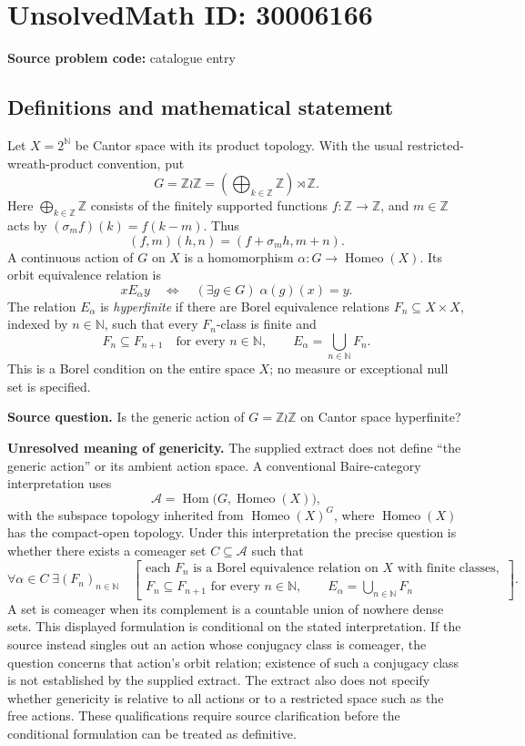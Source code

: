 \documentclass[11pt]{article}
\newcommand{\N}{\mathbb{N}}
\newcommand{\Z}{\mathbb{Z}}
\begin{document}
\section*{UnsolvedMath ID: 30006166}
\textbf{Source problem code:} catalogue entry
\subsection{Definitions and mathematical statement}
Let \(X=2^{\N}\) be Cantor space with its product topology. With the usual restricted-wreath-product convention, put
\[
G=\Z\wr\Z=\left(\bigoplus_{k\in\Z}\Z\right)\rtimes\Z.
\]
Here \(\bigoplus_{k\in\Z}\Z\) consists of the finitely supported functions \(f:\Z\to\Z\), and \(m\in\Z\) acts by \((\sigma_m f)(k)=f(k-m)\). Thus
\[
(f,m)(h,n)=(f+\sigma_m h,m+n).
\]
A continuous action of \(G\) on \(X\) is a homomorphism \(\alpha:G\to\operatorname{Homeo}(X)\). Its orbit equivalence relation is
\[
x\mathrel{E_\alpha}y\quad\Longleftrightarrow\quad (\exists g\in G)\;\alpha(g)(x)=y.
\]
The relation \(E_\alpha\) is \emph{hyperfinite} if there are Borel equivalence relations \(F_n\subseteq X\times X\), indexed by \(n\in\N\), such that every \(F_n\)-class is finite and
\[
F_n\subseteq F_{n+1}\quad\text{for every }n\in\N,
\qquad E_\alpha=\bigcup_{n\in\N}F_n.
\]
This is a Borel condition on the entire space \(X\); no measure or exceptional null set is specified.

\textbf{Source question.} Is the generic action of \(G=\Z\wr\Z\) on Cantor space hyperfinite?

\textbf{Unresolved meaning of genericity.} The supplied extract does not define ``the generic action'' or its ambient action space. A conventional Baire-category interpretation uses
\[
\mathcal A=\operatorname{Hom}\bigl(G,\operatorname{Homeo}(X)\bigr),
\]
with the subspace topology inherited from \(\operatorname{Homeo}(X)^G\), where \(\operatorname{Homeo}(X)\) has the compact-open topology. Under this interpretation the precise question is whether there exists a comeager set \(C\subseteq\mathcal A\) such that
\[
\forall\alpha\in C\;\exists(F_n)_{n\in\N}\quad
\left[
\begin{gathered}
\text{each }F_n\text{ is a Borel equivalence relation on }X
\text{ with finite classes},\\
F_n\subseteq F_{n+1}\text{ for every }n\in\N,
\qquad E_\alpha=\bigcup_{n\in\N}F_n
\end{gathered}
\right].
\]
A set is comeager when its complement is a countable union of nowhere dense sets. This displayed formulation is conditional on the stated interpretation. If the source instead singles out an action whose conjugacy class is comeager, the question concerns that action's orbit relation; existence of such a conjugacy class is not established by the supplied extract. The extract also does not specify whether genericity is relative to all actions or to a restricted space such as the free actions. These qualifications require source clarification before the conditional formulation can be treated as definitive.
\end{document}
